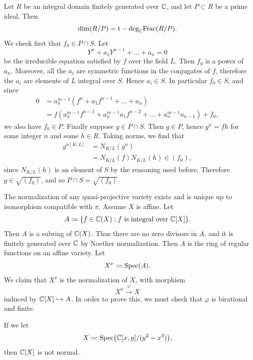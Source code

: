 \begin{theorem}{
Let $R$ be an integral domain finitely generated over $\mathbb{C}$, and let $P\subset R$ be a prime ideal.
Then
\[
\dim(R/P) = \mathrm{t-deg}_{\mathbb{C}}\mathrm{Frac}(R/P).
\]
}
We check first that $f_0\in P\cap S$.
Let
\[
Y^n + a_{1}Y^{n-1} + \ldots + a_n = 0
\]
be the irreducible equation satisfied by $f$ over the field $L$.
Then $f_0$ is a power of $a_n$.
Moreover, all the $a_i$ are symmetric functions in the conjugates of $f$, therefore the $a_i$ are elements of $L$ integral over $S$.
Hence $a_i\in S$.
In particular $f_0\in S$, and since
\begin{align*}
    0 &= a_n^{m-1}(f^n + a_{1}f^{n-1} + \ldots + a_n) \\
    &= f(a_n^{m-1}f^{n-1} + a_n^{m-1}a_{1}f^{n-2} + \ldots + a_n^{m-1}a_{n-1}) + f_0,
    \end{align*}
we also have $f_0\in P$.
Finally suppose $g\in P\cap S$.
Then $g\in P$, hence $g^n = fh$ for some integer $n$ and some $h\in R$.
Taking norms, we find that
\begin{align*}
g^{n[K:L]} &= N_{K/L}(g^n) \\
&= N_{K/L}(f)N_{K/L}(h)\in (f_0),
\end{align*}
since $N_{K/L}(h)$ is an element of $S$ by the reasoning used before.
Therefore $g\in \sqrt{(f_0)}$, and so $P\cap S = \sqrt{(f_0)}$.
\end{theorem}

\begin{theorem}{
The normalization of any quasi-projective variety exists and is unique up to isomorphism compatible with $\pi$.
}
Assume $X$ is affine.
Let
\[
A \coloneqq \{f\in\mathbb{C}(X) : f \text{ is integral over } \mathbb{C}[X]\}.
\]
Then $A$ is a subring of $\mathbb{C}(X)$.
Thus there are no zero divisors in $A$, and it is finitely generated over $\mathbb{C}$ by Noether normalization.
Then $A$ is the ring of regular functions on an affine variety.
Let
\[
X^\nu \coloneqq \mathrm{Spec}(A).
\]
We claim that $X^\nu$ is the normalization of $X$, with morphism
\[
X^\nu\overset{\varphi}{\longrightarrow} X
\]
induced by $\mathbb{C}[X]\hookrightarrow A$.
In order to prove this, we must check that $\varphi$ is birational and finite.
\end{theorem}

If we let
\[
X \coloneqq \mathrm{Spec}\bigl(\mathbb{C}[x,y]/(y^2 - x^3)\bigr),
\]
then $\mathbb{C}[X]$ is not normal.